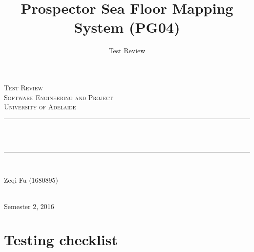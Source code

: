 \documentclass[12pt]{article}
\title{Prospector Sea Floor Mapping System (PG04)}
\author{Test Review}
\makeatletter
\let\thetitle\@title
\makeatother
\begin{document}

\begin{titlepage}
	\centering
    \vspace*{0.0 cm}
    \textsc{\LARGE Test Review}\\[2.0 cm]
	\textsc{\Large Software Engineering and Project}\\[0.5 cm]			
	\textsc{\large University of Adelaide}\\[0.5 cm]
	\rule{\linewidth}{0.2 mm} \\[0.4 cm]
	{ \huge \bfseries \thetitle}\\
	\rule{\linewidth}{0.2 mm} \\[1.5 cm]
	
	\begin{minipage}{0.4\textwidth}
		\begin{center} \large
			Zeqi Fu (1680895)\linebreak			
			\end{center}
	\end{minipage}\\[2 cm]
	
	{\large Semester 2, 2016}\\[2 cm]
 
	\vfill
	
\end{titlepage}

\pagebreak
\tableofcontents
\pagebreak



\section{Testing checklist}
\end{document}
